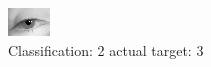 \begin{figure}[h!]
\begin{center}
\includegraphics[width=0.60\columnwidth]{figures/ID2866_class_2_target_3.png}
\end{center}
\caption{ Classification: 2 actual target: 3}
\label{fig:ID2866_class_2_target_3}
\end{figure}
